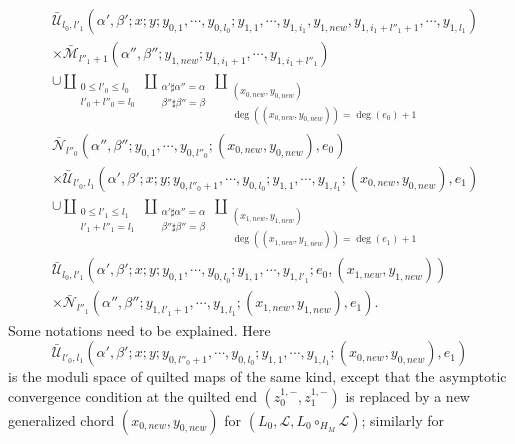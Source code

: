 \documentclass{amsart}
\numberwithin{equation}{section}
\numberwithin{figure}{section}
\begin{document}
\begin{equation}
\begin{split}
& \bar{\mathcal{U}}_{l_{0}, l'_{1}}(\alpha', \beta'; x; y; y_{0, 1}, \cdots, y_{0, l_{0}}; y_{1, 1}, \cdots, y_{1, i_{1}}, y_{1, new}, y_{1, i_{1} + l''_{1} + 1}, \cdots, y_{1, l_{1}})\\
& \times \bar{\mathcal{M}}_{l''_{1}+1}(\alpha'', \beta''; y_{1, new}; y_{1, i_{1}+1}, \cdots, y_{1, i_{1}+l''_{1}})\\
& \cup \coprod_{\substack{0 \le l'_{0} \le l_{0} \\ l'_{0} + l''_{0} = l_{0}}} \coprod_{\substack{\alpha' \sharp \alpha'' = \alpha \\ \beta'' \sharp \beta'' = \beta}} \coprod_{\substack{(x_{0, new}, y_{0, new})\\ \deg((x_{0, new}, y_{0, new})) = \deg(e_{0}) + 1}}\\
& \bar{\mathcal{N}}_{l''_{0}}(\alpha'', \beta''; y_{0, 1}, \cdots, y_{0, l''_{0}}; (x_{0, new}, y_{0, new}), e_{0})\\
& \times \bar{\mathcal{U}}_{l'_{0}, l_{1}}(\alpha', \beta'; x; y; y_{0, l''_{0}+1}, \cdots, y_{0, l_{0}}; y_{1, 1}, \cdots, y_{1, l_{1}}; (x_{0, new}, y_{0, new}), e_{1})\\
& \cup \coprod_{\substack{0 \le l'_{1} \le l_{1} \\ l'_{1}+l''_{1} = l_{1}}} \coprod_{\substack{\alpha' \sharp \alpha'' = \alpha \\ \beta'' \sharp \beta'' = \beta}} \coprod_{\substack{(x_{1, new}, y_{1, new})\\ \deg((x_{1, new}, y_{1, new})) = \deg(e_{1}) + 1}}\\
& \bar{\mathcal{U}}_{l_{0}, l'_{1}}(\alpha', \beta'; x; y; y_{0, 1}, \cdots, y_{0, l_{0}}; y_{1, 1}, \cdots, y_{1, l'_{1}}; e_{0}, (x_{1, new}, y_{1, new}))\\
& \times \bar{\mathcal{N}}_{l''_{1}}(\alpha'', \beta''; y_{1, l'_{1}+1}, \cdots, y_{1, l_{1}}; (x_{1, new}, y_{1, new}), e_{1}).
\end{split}
\end{equation}
Some notations need to be explained. Here 
\begin{equation*}
\bar{\mathcal{U}}_{l'_{0}, l_{1}}(\alpha', \beta'; x; y; y_{0, l''_{0}+1}, \cdots, y_{0, l_{0}}; y_{1, 1}, \cdots, y_{1, l_{1}}; (x_{0, new}, y_{0, new}), e_{1})
\end{equation*}
is the moduli space of quilted maps of the same kind, except that the asymptotic convergence condition at the quilted end $(z_{0}^{1, -}, z_{1}^{1, -})$ is replaced by a new generalized chord $(x_{0, new}, y_{0, new})$ for $(L_{0}, \mathcal{L}, L_{0} \circ_{H_{M}} \mathcal{L})$; similarly for 
\end{document}
